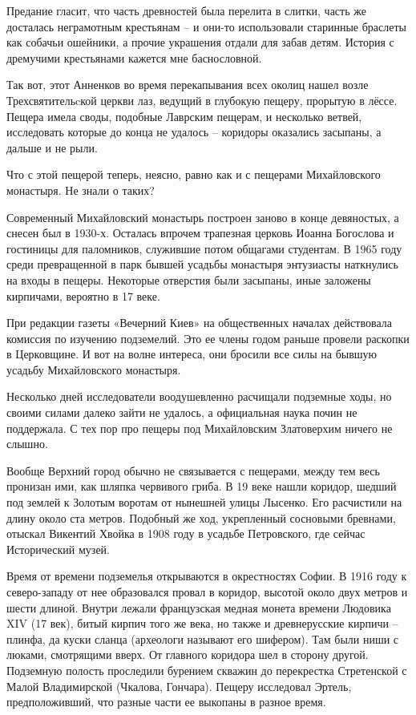 Предание гласит, что часть древностей была перелита в слитки, часть же досталась неграмотным крестьянам – и они-то использовали старинные браслеты как собачьи ошейники, а прочие украшения отдали для забав детям. История с дремучими крестьянами кажется мне баснословной. 

Так вот, этот Анненков во время перекапывания всех околиц нашел возле Трехсвятительcкой церкви лаз, ведущий в глубокую пещеру, прорытую в лёссе. Пещера имела своды, подобные Лаврским пещерам, и несколько ветвей, исследовать которые до конца не удалось – коридоры оказались засыпаны, а дальше и не рыли.

Что с этой пещерой теперь, неясно, равно как и с пещерами Михайловского монастыря. Не знали о таких?

Современный Михайловский монастырь построен заново в конце девяностых, а снесен был в 1930-х. Осталась впрочем трапезная церковь Иоанна Богослова и гостиницы для паломников, служившие потом общагами студентам. В 1965 году среди превращенной в парк бывшей усадьбы монастыря энтузиасты наткнулись на входы в пещеры. Некоторые отверстия были засыпаны, иные заложены кирпичами, вероятно в 17 веке.

При редакции газеты «Вечерний Киев» на общественных началах действовала комиссия по изучению подземелий. Это ее члены годом раньше провели раскопки в Церковщине. И вот на волне интереса, они бросили все силы на бывшую усадьбу Михайловского монастыря.

Несколько дней исследователи воодушевленно расчищали подземные ходы, но своими силами далеко зайти не удалось, а официальная наука почин не поддержала. С тех пор про пещеры под Михайловским Златоверхим ничего не слышно.

Вообще Верхний город обычно не связывается с пещерами, между тем весь пронизан ими, как шляпка червивого гриба. В 19 веке нашли коридор, шедший под землей к Золотым воротам от нынешней улицы Лысенко. Его расчистили на длину около ста метров. Подобный же ход, укрепленный сосновыми бревнами, отыскал Викентий Хвойка в 1908 году в усадьбе Петровского, где сейчас Исторический музей.

Время от времени подземелья открываются в окрестностях Софии. В 1916 году к северо-западу от нее образовался провал в коридор, высотой около двух метров и шести длиной. Внутри лежали французская медная монета времени Людовика XIV (17 век), битый кирпич того же века, но также и древнерусские кирпичи – плинфа, да куски сланца (археологи называют его шифером). Там были ниши с люками, смотрящими вверх. От главного коридора шел в сторону другой. Подземную полость проследили бурением скважин до перекрестка Стретенской с Малой Владимирской (Чкалова, Гончара). Пещеру исследовал Эртель, предположивший, что разные части ее выкопаны в разное время. 

